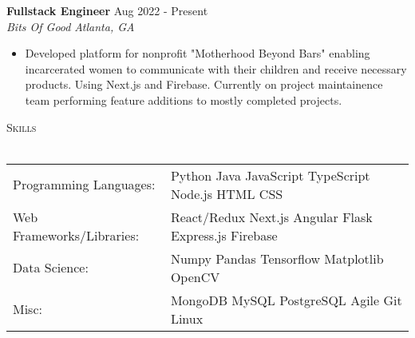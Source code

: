 \documentclass[a4paper]{article}
\newcommand{\lineunder} {
    \vspace*{-8pt} \\
    \hspace*{-18pt} \hrulefill \\
}
\newcommand{\header} [1] {
    {\hspace*{-18pt}\vspace*{6pt} \textsc{#1}}
    \vspace*{-6pt} \lineunder
}
\begin{document}
\textbf{Fullstack Engineer} \hfill Aug 2022 - Present\\
\textit{Bits Of Good} \hfill \textit{Atlanta, GA} \\
\vspace{-1mm}
\begin{itemize} \itemsep -1pt
	\item Developed platform for nonprofit "Motherhood Beyond Bars" enabling incarcerated women to communicate with their children and receive necessary products. Using Next.js and Firebase. Currently on project maintainence team performing feature additions to mostly completed projects.
\end{itemize}

\header{Skills}
\begin{tabular}{ l l }
	Programming Languages: & Python Java JavaScript TypeScript Node.js HTML CSS           \\
	Web Frameworks/Libraries:  & React/Redux Next.js Angular Flask Express.js Firebase \\
	Data Science:          & Numpy Pandas Tensorflow Matplotlib OpenCV                           \\
	Misc:             & MongoDB MySQL PostgreSQL Agile Git Linux                       \\
\end{tabular}
\vspace{2mm}


\ 
\end{document}
